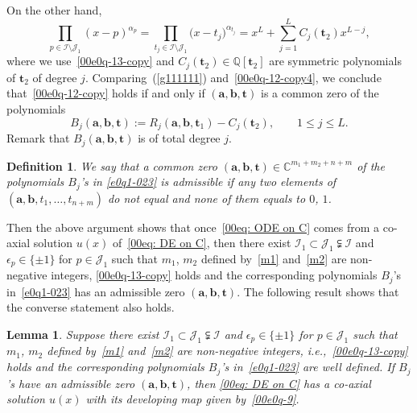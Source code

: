 \documentclass[10pt,a4paper]{amsart}
\numberwithin{equation}{section}
\newtheorem{Lemma}[Theorem]{Lemma}
\newtheorem{Definition}[Theorem]{Definition}
\def\Q{\mathbb Q}
\begin{document}
On the other hand,
\begin{equation}\label{00e0q-12-copy4} \prod_{p\in \mathcal{I}\setminus\mathcal{J}_1}(x-p)^{{\alpha}_{p}}=\prod_{t_j\in \mathcal{I}\setminus\mathcal{J}_1}\bigl(x-t_j\bigr)^{{\alpha}_{t_j}}=x^{L}
+\sum_{j=1}^{L}
C_j(\boldsymbol t_2)x^{L-j},\end{equation}
where we use~\eqref{00e0q-13-copy} and
$C_j(\boldsymbol t_2)\in \Q[\boldsymbol t_2]$ are symmetric polynomials of $\boldsymbol t_2$ of degree $j$.
Comparing~(\ref{g111111}) and~\eqref{00e0q-12-copy4}, we conclude that~\eqref{00e0q-12-copy} holds if and only if $(\boldsymbol a, \boldsymbol b, \boldsymbol t)$ is a common zero of the polynomials
\begin{equation}\label{e0q1-023}B_j(\boldsymbol a,\boldsymbol b,\boldsymbol t):=R_j(\boldsymbol a,\boldsymbol b,\boldsymbol t_1)-C_j(\boldsymbol t_2),\qquad 1\leq j\leq L.\end{equation}
Remark that $B_j(\boldsymbol a,\boldsymbol b,\boldsymbol t)$ is of total degree $j$.

\begin{Definition}
We say that a common zero $(\boldsymbol a,\boldsymbol b,\boldsymbol
t)\in\mathbb{C}^{m_1+m_2+n+m}$ of the polynomials $B_j$'s in
\eqref{e0q1-023} is \emph{admissible} if any two elements of
$(\boldsymbol a,\boldsymbol b,t_1,\dots, t_{n+m})$ do not equal and
none of them equals to $0$, $1$.
\end{Definition}

Then the above argument shows that once~\eqref{00eq: ODE on C} comes
from a co-axial solution $u(x)$ of~\eqref{00eq: DE on C}, then there
exist $\mathcal{I}_1\subset\mathcal{J}_1\subsetneqq \mathcal{I}$ and
$\epsilon_p\in \{\pm 1\}$ for $p\in\mathcal{J}_1$ such that $m_1$, $m_2$
defined by~\eqref{m1} and~\eqref{m2} are non-negative integers,
\eqref{00e0q-13-copy} holds and the corresponding polynomials $B_j$'s
in~\eqref{e0q1-023} has an admissible zero $(\boldsymbol a,\boldsymbol
b,\boldsymbol t)$. The following result shows that the converse
statement also holds.

\begin{Lemma}\label{lem3-5}
Suppose there exist
$\mathcal{I}_1\subset\mathcal{J}_1\subsetneqq \mathcal{I}$ and
$\epsilon_p\in \{\pm 1\}$ for $p\in\mathcal{J}_1$ such that $m_1$, $m_2$
defined by~\eqref{m1} and~\eqref{m2} are non-negative integers,
i.e.,~\eqref{00e0q-13-copy} holds and the corresponding polynomials
$B_j$'s in~\eqref{e0q1-023} are well defined. If $B_j$'s have an
admissible zero $(\boldsymbol a,\boldsymbol b,\boldsymbol t)$, then
\eqref{00eq: DE on C} has a co-axial solution $u(x)$ with its
developing map given by~\eqref{00e0q-9}.
\end{Lemma}
\end{document}
